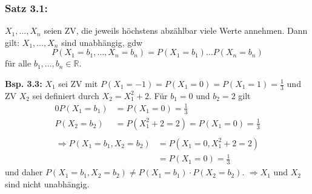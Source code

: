 \documentclass[a4paper,11pt]{article}
\begin{document}
\subsubsection{Satz 3.1:} $X_1,\dots,X_n$ seien ZV, die jeweils höchstens abzählbar viele Werte annehmen. Dann gilt: $X_1,\dots,X_n$ sind unabhängig, gdw 
\[P(X_1=b_1,\dots,X_n=b_n) = P(X_1=b_1)\dots P(X_n=b_n)\] 
für alle $b_1,\dots,b_n\in\mathbb{R}$.

\vspace{6pt}
\noindent\textbf{Bsp. 3.3:} 
$X_1$ sei ZV mit $P(X_1=-1)=P(X_1=0)=P(X_1=1)=\frac{1}{3}$ und ZV $X_2$ sei definiert durch $X_2=X_1^2+2$.
\newline Für $b_1=0$ und $b_2=2$ gilt 
\begin{align*}0 
P(X_1=b_1)&=P(X_1=0)=\frac{1}{3}\\
P(X_2=b_2)&=P(X_1^2+2=2)=P(X_1=0)=\frac{1}{3}\\
\end{align*}
\begin{align*}
\Rightarrow P(X_1=b_1,X_2=b_2)&=P(X_1=0,X_1^2+2=2)\\
&=P(X_1=0)=\frac{1}{3}
\end{align*}
und daher $P(X_1=b_1,X_2=b_2)\neq P(X_1=b_1)\cdot P(X_2=b_2)$.
\newline $\Rightarrow X_1$ und $X_2$ sind nicht unabhängig.
\end{document}
